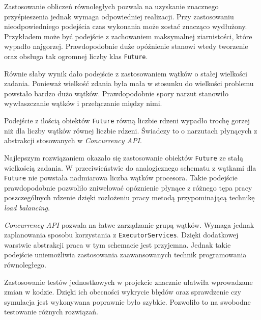 \documentclass{mwart}
\begin{document}
Zastosowanie obliczeń równoległych pozwala na uzyskanie znacznego przyśpieszenia jednak wymaga odpowiedniej realizacji. Przy zastosowaniu nieodpowiedniego podejścia czas wykonania może zostać znacząco wydłużony. Przykładem może być podejście z zachowaniem maksymalnej ziarnistości, które wypadło najgorzej. Prawdopodobnie duże opóźnienie stanowi wtedy tworzenie oraz obsługa tak ogromnej liczby klas \texttt{Future}.

Równie słaby wynik dało podejście z zastosowaniem wątków o stałej wielkości zadania. Ponieważ wielkość zdania była mała w stosunku do wielkości problemu powstało bardzo dużo wątków. Prawdopodobnie spory narzut stanowiło wywłaszczanie wątków i przełączanie między nimi.

Podejście z ilością obiektów \texttt{Future} równą liczbie rdzeni wypadło trochę gorzej niż dla liczby wątków równej liczbie rdzeni. Świadczy to o narzutach płynących z abstrakcji stosowanych w \textit{Concurrency API}.

Najlepszym rozwiązaniem okazało się zastosowanie obiektów \texttt{Future} ze stałą wielkością zadania. W przeciwieństwie do analogicznego schematu z wątkami dla \texttt{Future} nie powstała nadmiarowa liczba wątków procesora. Takie podejście prawdopodobnie pozwoliło zniwelować opóznienie płynące z różnego tępa pracy poszczególnych rdzenie dzięki rozłożeniu pracy metodą przypominającą technikę \textit{load balancing}.

\vspace{5mm}

\textit{Concurrency API} pozwala na łatwe zarządzanie grupą wątków. Wymaga jednak zaplanowania sposobu korzystania z \texttt{ExecutorServices}. Dzięki dodatkowej warstwie abstrakcji praca w tym schemacie jest przyjemna. Jednak takie podejście uniemożliwia zastosowania zaawansowanych technik programowania równoległego.

\vspace{5mm}

Zastosowanie testów jednostkowych w projekcie znacznie ułatwiła wprowadzane zmian w kodzie. Dzięki ich obecności wykrycie błędów oraz sprawdzenie czy symulacja jest wykonywana poprawnie było szybkie. Pozwoliło to na swobodne testowanie różnych rozwiązań.
\end{document}
